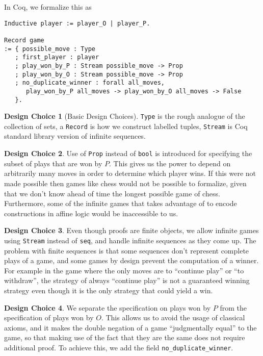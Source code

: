 \documentclass{article}
\theoremstyle{definition}
\newtheorem*{designchoice}{Design Choice}
\begin{document}
In Coq, we formalize this as 
\begin{verbatim}
Inductive player := player_O | player_P.

Record game
:= { possible_move : Type
   ; first_player : player
   ; play_won_by_P : Stream possible_move -> Prop
   ; play_won_by_O : Stream possible_move -> Prop
   ; no_duplicate_winner : forall all_moves,
      play_won_by_P all_moves -> play_won_by_O all_moves -> False
   }.
\end{verbatim}
\begin{designchoice}[Basic Design Choices]
\verb|Type| is the rough analogue of the collection of sets, a \verb|Record| is how we construct labelled tuples, \verb|Stream| is Coq standard library version of infinite sequences. 
\end{designchoice}
\begin{designchoice}
 Use of \verb|Prop| instead of \verb|bool| is introduced for specifying the subset of plays that are won by $P$. This gives us the power to depend on arbitrarily many moves in order to determine which player wins. If this were not made possible then games like chess would not be possible to formalize, given that we don't know ahead of time the longest possible game of chess. Furthermore, some of the infinite games that \textcite{Blass1992} takes advantage of to encode constructions in affine logic would be inaccessible to us. 
\end{designchoice}
\begin{designchoice}
Even though proofs are finite objects, we allow infinite games using \verb|Stream| instead of \verb|seq|, and handle infinite sequences as they come up. The problem with finite sequences is that some sequences don't represent complete plays of a game, and some games by design prevent the computation of a winner. For example in the game where the only moves are to ``continue play'' or ``to withdraw'', the strategy of always ``continue play'' is not a guaranteed winning strategy even though it is the only strategy that could yield a win. 
\end{designchoice}
\begin{designchoice}
We separate the specification on plays won by $P$ from the specification of plays won by $O$. This allows us to avoid the usage of classical axioms, and it makes the double negation of a game ``judgmentally equal'' to the game, so that making use of the fact that they are the same does not require additional proof. To achieve this, we add the field \verb|no_duplicate_winner|. 
\end{designchoice}
\end{document}
